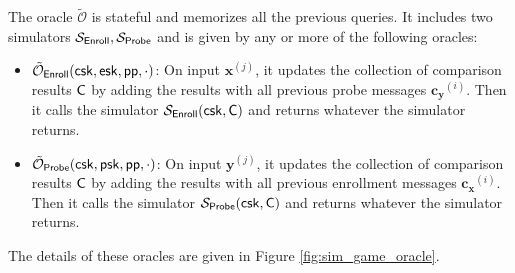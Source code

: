 The oracle $\tilde{\mathcal{O}}$ is stateful and memorizes all the previous queries. It includes two simulators $\mathcal{S}_{\sf Enroll}, \mathcal{S}_{\sf Probe}$ and is given by any or more of the following oracles:

\begin{itemize}

	\item $\tilde{\mathcal{O}}_{\sf Enroll} ({\sf csk} ,{\sf esk}, {\sf pp}, \cdot)$: On input $\mathbf{x}^{(j)}$, it updates the collection of comparison results ${\sf C}$ by adding the results with all previous probe messages $\mathbf{c_y}^{(i)}$. Then it calls the simulator $\mathcal{S}_{\sf Enroll}({\sf csk}, {\sf C})$ and returns whatever the simulator returns.

	\item $\tilde{\mathcal{O}}_{\sf Probe} ({\sf csk}, {\sf psk}, {\sf pp}, \cdot)$: On input $\mathbf{y}^{(j)}$, it updates the collection of comparison results ${\sf C}$ by adding the results with all previous enrollment messages $\mathbf{c_x}^{(i)}$. Then it calls the simulator $\mathcal{S}_{\sf Probe}({\sf csk}, {\sf C})$ and returns whatever the simulator returns.

\end{itemize}

The details of these oracles are given in Figure \ref{fig:sim_game_oracle}.

